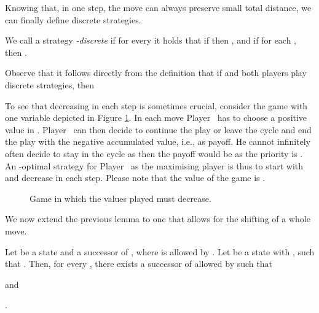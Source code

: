 \documentclass[fleqn,envcountsame]{LMCS}
\newcommand{\ie}{i.e.\xspace}
\newcommand{\pzero}{Player~\xspace}
\newcommand{\pone}{Player~\xspace}
\begin{document}
Knowing that, in one step, the move can always preserve small
total distance, we can finally define discrete strategies.

\begin{defi} \label{edisc}
We call a strategy  \emph{-discrete}
if for every  it holds that
if  then
, and if for each 
, then .
\end{defi}

Observe that it follows directly from the definition that if
 and both players play discrete
strategies, then 

\begin{exa}
To see that decreasing  in each step is sometimes crucial,
consider the game with one variable depicted in Figure \ref{fig-eps-need}.
In each move \pzero has to choose a positive value in .
\pone can then decide to continue the play or leave the
cycle and end the play with the negative accumulated
value, \ie , as payoff. He cannot infinitely
often decide to stay in the cycle as then the payoff
would be  as the priority is .
An -optimal strategy for \pzero as the maximising player
is thus to start with  and decrease in each step.
Please note that the value of the game is .

\begin{figure}[h]
\begin{center}
\end{center}
\caption{Game in which the values played must decrease.}
\label{fig-eps-need}
\end{figure}
\end{exa}

We now extend the previous lemma to one that allows for the shifting of a whole move.
\begin{lem}\label{discrete_succ2}
Let  be a state and  a successor of ,
where  is allowed by .
Let  be a state with , such that . 
Then, for every , there exists a successor  of 
allowed by  such that
\begin{iteMize}{}
\item  and
\item .
\end{iteMize}
\end{lem}
\end{document}
